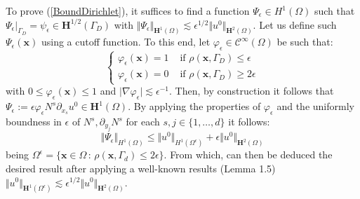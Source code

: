 To prove (\ref{BoundDirichlet}), it suffices to find a function $\Psi_{\epsilon} \in H^1(\Omega)$ such that $\Psi_{\epsilon} \vert_{\Gamma_D} = \psi_{\epsilon} \in \mathbf{H}^{1/2}(\Gamma_D)$ with $\Vert \Psi_{\epsilon} \Vert_{\mathbf{H}^1(\Omega)} \lesssim \epsilon^{1/2} \Vert u^0 \Vert_{\mathbf{H}^2(\Omega)}$.
Let us define such $\Psi_{\epsilon}(\mathbf{x})$ using a cutoff function. To this end, let $\varphi_{\epsilon} \in \mathcal{C}^{\infty}(\Omega)$ be such that:
\begin{equation*}
    \left \{
    \begin{aligned}
    \varphi_{\epsilon}(\mathbf{x}) = 1 & \text{ if } \rho(\mathbf{x}, \Gamma_D) \leq \epsilon \\
    \varphi_{\epsilon}(\mathbf{x}) = 0 & \text{ if } \rho(\mathbf{x}, \Gamma_D) \geq 2\epsilon 
    \end{aligned}
    \right.
\end{equation*}
with $0 \leq \varphi_{\epsilon}(\mathbf{x}) \leq 1$ and $\vert \nabla \varphi_{\epsilon} \vert \lesssim \epsilon^{-1}$.
Then, by construction it follows that $\Psi_{\epsilon} := \epsilon \varphi_{\epsilon} N^s \partial_{x_s}u^0 \in \mathbf{H}^1(\Omega)$.
By applying the properties of $\varphi_{\epsilon}$ and the uniformly boundness in $\epsilon$ of $N^s, \partial_{y_j} N^s$ for each $s,j \in \{1,\dots, d\}$ it follows:
\begin{equation*}
    \Vert \Psi_{\epsilon} \Vert_{H^1(\Omega)} \leq \Vert u^0 \Vert_{H^1(\Omega^{\epsilon})} + \epsilon \Vert u^0 \Vert_{\mathbf{H}^2(\Omega)}
\end{equation*}
being $\Omega^{\epsilon} = \{\mathbf{x}\in \Omega \, :\, \rho(\mathbf{x},\Gamma_d) \leq 2\epsilon \}$. From which, can then be deduced the desired result after applying a well-known results (Lemma 1.5) $\Vert u^0 \Vert_{\mathbf{H}^1(\Omega^{\epsilon})} \lesssim \epsilon^{1/2} \Vert u^0 \Vert_{\mathbf{H}^2(\Omega)}$.

